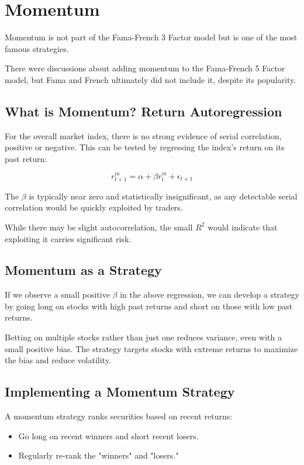 \documentclass{article}
\begin{document}
\section{Momentum}
Momentum is not part of the Fama-French 3 Factor model but is one of the most famous strategies.

There were discussions about adding momentum to the Fama-French 5 Factor model, but Fama and French ultimately did not include it, despite its popularity.

\subsection{What is Momentum? Return Autoregression}
For the overall market index, there is no strong evidence of serial correlation, positive or negative. This can be tested by regressing the index's return on its past return:

\[
r^{m}_{t+1}=\alpha+\beta{r^{m}_t}+{\epsilon_{t+1}}
\]

The $\beta$ is typically near zero and statistically insignificant, as any detectable serial correlation would be quickly exploited by traders.

While there may be slight autocorrelation, the small $R^2$ would indicate that exploiting it carries significant risk.

\subsection{Momentum as a Strategy}
If we observe a small positive $\beta$ in the above regression, we can develop a strategy by going long on stocks with high past returns and short on those with low past returns.

Betting on multiple stocks rather than just one reduces variance, even with a small positive bias. The strategy targets stocks with extreme returns to maximize the bias and reduce volatility.

\subsection{Implementing a Momentum Strategy}
A momentum strategy ranks securities based on recent returns:
\begin{itemize}
    \item Go long on recent winners and short recent losers.
    \item Regularly re-rank the "winners" and "losers."
\end{itemize}
\end{document}

